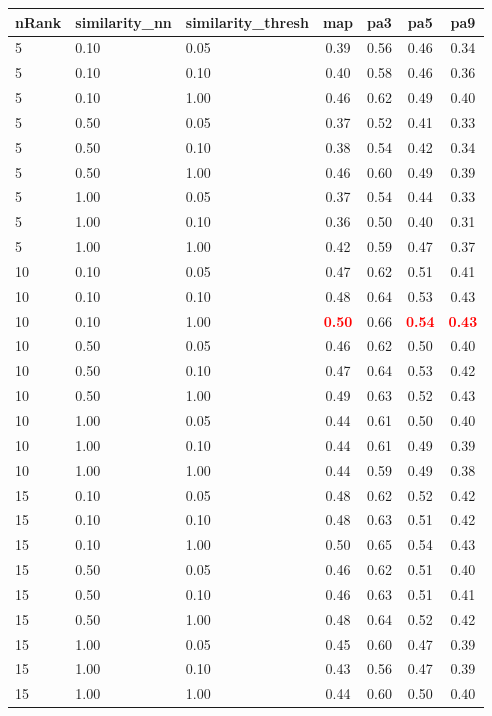 \begin{tabular}{lllcccc} 
nRank & similarity\_nn & similarity\_thresh & map & pa3 & pa5 & pa9 \\ 
\hline 
 5 & 0.10 & 0.05 & 0.39 & 0.56 & 0.46 & 0.34 \\ 
 5 & 0.10 & 0.10 & 0.40 & 0.58 & 0.46 & 0.36 \\ 
 5 & 0.10 & 1.00 & 0.46 & 0.62 & 0.49 & 0.40 \\ 
 5 & 0.50 & 0.05 & 0.37 & 0.52 & 0.41 & 0.33 \\ 
 5 & 0.50 & 0.10 & 0.38 & 0.54 & 0.42 & 0.34 \\ 
 5 & 0.50 & 1.00 & 0.46 & 0.60 & 0.49 & 0.39 \\ 
 5 & 1.00 & 0.05 & 0.37 & 0.54 & 0.44 & 0.33 \\ 
 5 & 1.00 & 0.10 & 0.36 & 0.50 & 0.40 & 0.31 \\ 
 5 & 1.00 & 1.00 & 0.42 & 0.59 & 0.47 & 0.37 \\ 
10 & 0.10 & 0.05 & 0.47 & 0.62 & 0.51 & 0.41 \\ 
10 & 0.10 & 0.10 & 0.48 & 0.64 & 0.53 & 0.43 \\ 
10 & 0.10 & 1.00 & \textbf{\textcolor{red}{0.50}} & 0.66 & \textbf{\textcolor{red}{0.54}} & \textbf{\textcolor{red}{0.43}} \\ 
10 & 0.50 & 0.05 & 0.46 & 0.62 & 0.50 & 0.40 \\ 
10 & 0.50 & 0.10 & 0.47 & 0.64 & 0.53 & 0.42 \\ 
10 & 0.50 & 1.00 & 0.49 & 0.63 & 0.52 & 0.43 \\ 
10 & 1.00 & 0.05 & 0.44 & 0.61 & 0.50 & 0.40 \\ 
10 & 1.00 & 0.10 & 0.44 & 0.61 & 0.49 & 0.39 \\ 
10 & 1.00 & 1.00 & 0.44 & 0.59 & 0.49 & 0.38 \\ 
15 & 0.10 & 0.05 & 0.48 & 0.62 & 0.52 & 0.42 \\ 
15 & 0.10 & 0.10 & 0.48 & 0.63 & 0.51 & 0.42 \\ 
15 & 0.10 & 1.00 & 0.50 & 0.65 & 0.54 & 0.43 \\ 
15 & 0.50 & 0.05 & 0.46 & 0.62 & 0.51 & 0.40 \\ 
15 & 0.50 & 0.10 & 0.46 & 0.63 & 0.51 & 0.41 \\ 
15 & 0.50 & 1.00 & 0.48 & 0.64 & 0.52 & 0.42 \\ 
15 & 1.00 & 0.05 & 0.45 & 0.60 & 0.47 & 0.39 \\ 
15 & 1.00 & 0.10 & 0.43 & 0.56 & 0.47 & 0.39 \\ 
15 & 1.00 & 1.00 & 0.44 & 0.60 & 0.50 & 0.40 \\ 

\end{tabular}
